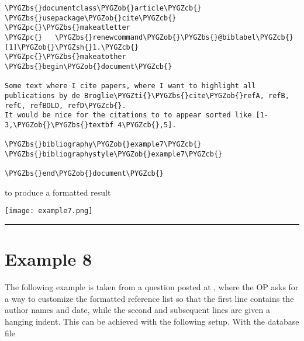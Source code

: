 \documentclass[letterpaper,10pt,english]{sphinxmanual}
\def\PYGZbs{\char`\\}
\def\PYGZob{\char`\{}
\def\PYGZcb{\char`\}}
\def\PYGZsh{\char`\#}
\def\PYGZpc{\char`\%}
\def\PYGZti{\char`\~}
\begin{document}
\begin{Verbatim}[commandchars=\\\{\}]
\PYGZbs{}documentclass\PYGZob{}article\PYGZcb{}
\PYGZbs{}usepackage\PYGZob{}cite\PYGZcb{}
\PYGZpc{}\PYGZbs{}makeatletter
\PYGZpc{}   \PYGZbs{}renewcommand\PYGZob{}\PYGZbs{}@biblabel\PYGZcb{}[1]\PYGZob{}\PYGZsh{}1.\PYGZcb{}
\PYGZpc{}\PYGZbs{}makeatother
\PYGZbs{}begin\PYGZob{}document\PYGZcb{}

Some text where I cite papers, where I want to highlight all publications by de Broglie\PYGZti{}\PYGZbs{}cite\PYGZob{}refA, refB, refC, refBOLD, refD\PYGZcb{}. 
It would be nice for the citations to to appear sorted like [1-3,\PYGZob{}\PYGZbs{}textbf 4\PYGZcb{},5].

\PYGZbs{}bibliography\PYGZob{}example7\PYGZcb{}
\PYGZbs{}bibliographystyle\PYGZob{}example7\PYGZcb{}

\PYGZbs{}end\PYGZob{}document\PYGZcb{}
\end{Verbatim}

to produce a formatted result

\texttt{[image: example7.png]}


\bigskip\hrule{}\bigskip



\section{Example 8}
\label{examples:example-8}
The following example is taken from a question posted at , where the OP asks for a way to customize the formatted reference list so that the first line contains the author names and date, while the second and subsequent lines are given a hanging indent. This can be achieved with the following setup. With the database file
\end{document}
